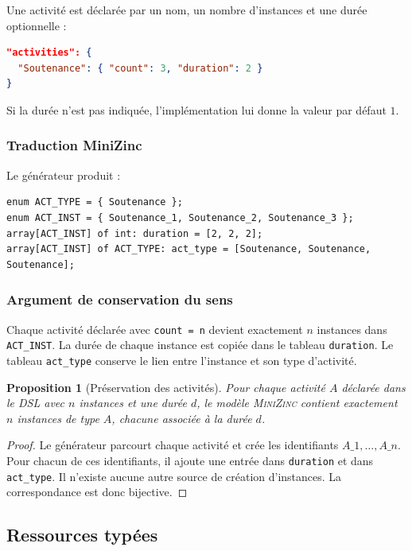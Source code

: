 \documentclass[12pt,a4paper]{article}
\newtheorem{proposition}{Proposition}[section]
\newcommand{\MZN}{\textsc{MiniZinc}}
\begin{document}
Une activité est déclarée par un nom, un nombre d'instances et une durée optionnelle :

\begin{lstlisting}[language=JSON]
"activities": {
  "Soutenance": { "count": 3, "duration": 2 }
}
\end{lstlisting}

Si la durée n'est pas indiquée, l'implémentation lui donne la valeur par défaut $1$.

\subsubsection*{Traduction MiniZinc}

Le générateur produit :

\begin{lstlisting}[language=MiniZinc]
enum ACT_TYPE = { Soutenance };
enum ACT_INST = { Soutenance_1, Soutenance_2, Soutenance_3 };
array[ACT_INST] of int: duration = [2, 2, 2];
array[ACT_INST] of ACT_TYPE: act_type = [Soutenance, Soutenance, Soutenance];
\end{lstlisting}

\subsubsection*{Argument de conservation du sens}

Chaque activité déclarée avec \texttt{count = n} devient exactement $n$ instances dans \texttt{ACT\_INST}. La durée de chaque instance est copiée dans le tableau \texttt{duration}. Le tableau \texttt{act\_type} conserve le lien entre l'instance et son type d'activité.

\begin{proposition}[Préservation des activités]
Pour chaque activité $A$ déclarée dans le DSL avec $n$ instances et une durée $d$, le modèle \MZN{} contient exactement $n$ instances de type $A$, chacune associée à la durée $d$.
\end{proposition}

\begin{proof}
Le générateur parcourt chaque activité et crée les identifiants $A\_1, \ldots, A\_n$. Pour chacun de ces identifiants, il ajoute une entrée dans \texttt{duration} et dans \texttt{act\_type}. Il n'existe aucune autre source de création d'instances. La correspondance est donc bijective.
\end{proof}

\subsection{Ressources typées}
\end{document}
